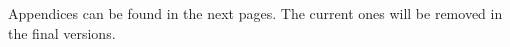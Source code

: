 \documentclass[main.tex]{subfiles}
\begin{document}
    \appendix
    Appendices can be found in the next pages. The current ones will be removed in the final versions.
    
    
\end{document}
